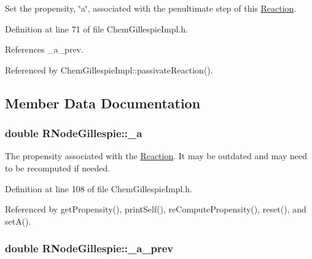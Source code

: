 Set the propensity, \char`\"{}a\char`\"{}, associated with the penultimate step of this \hyperlink{classReaction}{Reaction}. 



Definition at line 71 of file Chem\+Gillespie\+Impl.\+h.



References \+\_\+a\+\_\+prev.



Referenced by Chem\+Gillespie\+Impl\+::passivate\+Reaction().



\subsection{Member Data Documentation}
\hypertarget{classRNodeGillespie_a6e27b71748a2fdaef116fc0a0f3b4781}{
\subsubsection[{\+\_\+a}]{\setlength{\rightskip}{0pt plus 5cm}double R\+Node\+Gillespie\+::\+\_\+a\hspace{0.3cm}{\ttfamily [private]}}}\label{classRNodeGillespie_a6e27b71748a2fdaef116fc0a0f3b4781}


The propensity associated with the \hyperlink{classReaction}{Reaction}. It may be outdated and may need to be recomputed if needed. 



Definition at line 108 of file Chem\+Gillespie\+Impl.\+h.



Referenced by get\+Propensity(), print\+Self(), re\+Compute\+Propensity(), reset(), and set\+A().

\hypertarget{classRNodeGillespie_ae132221a1a09a566b08808c996f8b51c}{
\subsubsection[{\+\_\+a\+\_\+prev}]{\setlength{\rightskip}{0pt plus 5cm}double R\+Node\+Gillespie\+::\+\_\+a\+\_\+prev\hspace{0.3cm}{\ttfamily [private]}}}\label{classRNodeGillespie_ae132221a1a09a566b08808c996f8b51c}


